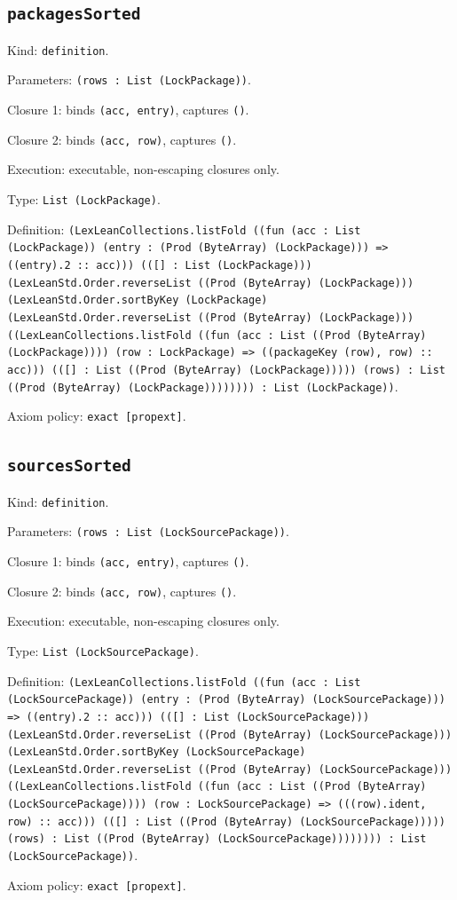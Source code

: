 \documentclass[11pt]{article}
\begin{document}
\subsection*{\texttt{packagesSorted}}
\noindent Kind: \texttt{definition}.\par
\noindent Parameters: \texttt{(rows : List (LockPackage))}.\par
\noindent Closure 1: binds \texttt{(acc, entry)}, captures \texttt{()}.\par
\noindent Closure 2: binds \texttt{(acc, row)}, captures \texttt{()}.\par
\noindent Execution: executable, non-escaping closures only.\par
\noindent Type: \texttt{List (LockPackage)}.\par
\noindent Definition: \texttt{(LexLeanCollections.listFold ((fun (acc : List (LockPackage)) (entry : (Prod (ByteArray) (LockPackage))) => ((entry).2 :: acc))) (([] : List (LockPackage))) (LexLeanStd.Order.reverseList ((Prod (ByteArray) (LockPackage))) (LexLeanStd.Order.sortByKey (LockPackage) (LexLeanStd.Order.reverseList ((Prod (ByteArray) (LockPackage))) ((LexLeanCollections.listFold ((fun (acc : List ((Prod (ByteArray) (LockPackage)))) (row : LockPackage) => ((packageKey (row), row) :: acc))) (([] : List ((Prod (ByteArray) (LockPackage))))) (rows) : List ((Prod (ByteArray) (LockPackage)))))))) : List (LockPackage))}.\par
\noindent Axiom policy: \texttt{exact [propext]}.\par
\subsection*{\texttt{sourcesSorted}}
\noindent Kind: \texttt{definition}.\par
\noindent Parameters: \texttt{(rows : List (LockSourcePackage))}.\par
\noindent Closure 1: binds \texttt{(acc, entry)}, captures \texttt{()}.\par
\noindent Closure 2: binds \texttt{(acc, row)}, captures \texttt{()}.\par
\noindent Execution: executable, non-escaping closures only.\par
\noindent Type: \texttt{List (LockSourcePackage)}.\par
\noindent Definition: \texttt{(LexLeanCollections.listFold ((fun (acc : List (LockSourcePackage)) (entry : (Prod (ByteArray) (LockSourcePackage))) => ((entry).2 :: acc))) (([] : List (LockSourcePackage))) (LexLeanStd.Order.reverseList ((Prod (ByteArray) (LockSourcePackage))) (LexLeanStd.Order.sortByKey (LockSourcePackage) (LexLeanStd.Order.reverseList ((Prod (ByteArray) (LockSourcePackage))) ((LexLeanCollections.listFold ((fun (acc : List ((Prod (ByteArray) (LockSourcePackage)))) (row : LockSourcePackage) => (((row).ident, row) :: acc))) (([] : List ((Prod (ByteArray) (LockSourcePackage))))) (rows) : List ((Prod (ByteArray) (LockSourcePackage)))))))) : List (LockSourcePackage))}.\par
\noindent Axiom policy: \texttt{exact [propext]}.\par
\end{document}
